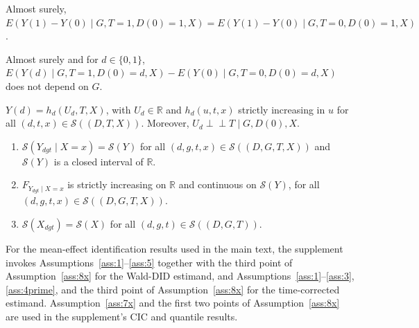 \begin{assumption}\label{ass:5}
Almost surely, $E(Y(1)-Y(0)\mid G, T = 1, D(0)=1, X) = E(Y(1)-Y(0)\mid G, T = 0, D(0)=1, X)$.
\end{assumption}

\setcounter{assumption}{3}
\renewcommand{\theassumption}{\arabic{assumption}$'$X}
\renewcommand{\theHassumption}{\arabic{assumption}primeX}
\begin{assumption}\label{ass:4prime}
Almost surely and for $d \in \{0,1\}$, $E(Y(d)\mid G, T = 1, D(0)=d, X) - E(Y(0)\mid G, T = 0, D(0)=d, X)$ does not depend on $G$.
\end{assumption}

\renewcommand{\theassumption}{\arabic{assumption}X}
\renewcommand{\theHassumption}{\arabic{assumption}X}
\setcounter{assumption}{6}

\begin{assumption}\label{ass:7x}
$Y(d) = h_d(U_d,T,X)$, with $U_d \in \mathbb{R}$ and $h_d(u,t,x)$ strictly increasing in $u$ for all $(d,t,x) \in \mathcal{S}((D,T,X))$. Moreover, $U_d \perp\!\!\!\perp T \mid G, D(0), X$.
\end{assumption}

\begin{assumption}\label{ass:8x}
\begin{enumerate}
\item $\mathcal{S}(Y_{dgt}\mid X=x) = \mathcal{S}(Y)$ for all $(d,g,t,x) \in \mathcal{S}((D,G,T,X))$ and $\mathcal{S}(Y)$ is a closed interval of $\mathbb{R}$.
\item $F_{Y_{dgt}\mid X=x}$ is strictly increasing on $\mathbb{R}$ and continuous on $\mathcal{S}(Y)$, for all $(d,g,t,x) \in \mathcal{S}((D,G,T,X))$.
\item $\mathcal{S}(X_{dgt}) = \mathcal{S}(X)$ for all $(d,g,t) \in \mathcal{S}((D,G,T))$.
\end{enumerate}
\end{assumption}

For the mean-effect identification results used in the main text, the supplement invokes Assumptions~\ref{ass:1}--\ref{ass:5} together with the third point of Assumption~\ref{ass:8x} for the Wald-DID estimand, and Assumptions~\ref{ass:1}--\ref{ass:3}, \ref{ass:4prime}, and the third point of Assumption~\ref{ass:8x} for the time-corrected estimand. Assumption~\ref{ass:7x} and the first two points of Assumption~\ref{ass:8x} are used in the supplement's CIC and quantile results.

